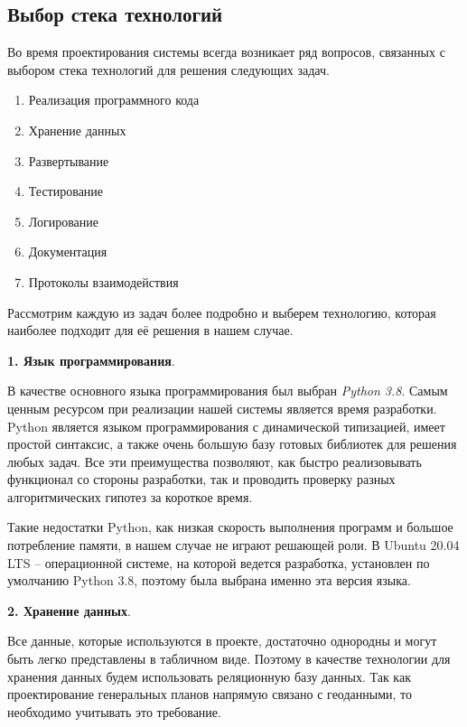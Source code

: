 \subsection*{\large{Выбор стека технологий}}
Во время проектирования системы всегда возникает ряд вопросов,
связанных с выбором стека технологий для решения следующих задач.

\begin{enumerate}
    \item Реализация программного кода
    \item Хранение данных
    \item Развертывание
    \item Тестирование
    \item Логирование
    \item Документация
    \item Протоколы взаимодействия
\end{enumerate}

Рассмотрим каждую из задач более подробно и выберем технологию, которая наиболее подходит для её решения в нашем случае.

\noindent \textbf{1. Язык программирования}.

В качестве основного языка программирования был выбран \textit{Python 3.8}\cite{PythonReference}.
Самым ценным ресурсом при реализации нашей системы является время разработки. Python является языком программирования
с динамической типизацией, имеет простой синтаксис,
а также очень большую базу готовых библиотек для решения любых задач.
Все эти преимущества позволяют, как быстро реализовывать функционал со стороны разработки, так и проводить проверку
разных алгоритмических гипотез за короткое время.

Такие недостатки Python, как низкая скорость выполнения программ и большое потребление памяти, в нашем случае
не играют решающей роли\cite{PythonProsAndCons}.
В Ubuntu 20.04 LTS -- операционной системе, на которой ведется разработка, установлен по умолчанию Python 3.8, поэтому
была выбрана именно эта версия языка.

\noindent \textbf{2. Хранение данных}.

Все данные, которые используются в проекте, достаточно однородны и могут быть легко представлены в табличном виде.
Поэтому в качестве технологии для хранения данных будем использовать реляционную базу данных.
Так как проектирование генеральных планов напрямую связано с геоданными, то необходимо учитывать это требование.

